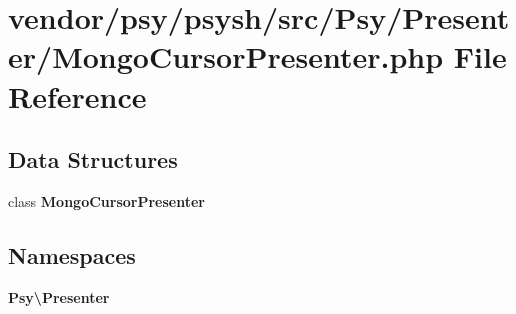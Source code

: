 \section{vendor/psy/psysh/src/\+Psy/\+Presenter/\+Mongo\+Cursor\+Presenter.php File Reference}
\label{_mongo_cursor_presenter_8php}
\subsection*{Data Structures}
\begin{DoxyCompactItemize}
\item 
class {\bf Mongo\+Cursor\+Presenter}
\end{DoxyCompactItemize}
\subsection*{Namespaces}
\begin{DoxyCompactItemize}
\item 
 {\bf Psy\textbackslash{}\+Presenter}
\end{DoxyCompactItemize}
